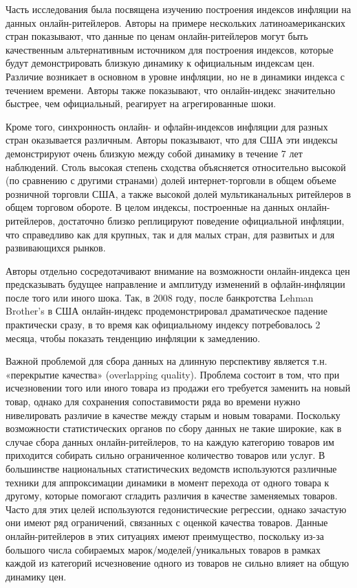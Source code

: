Часть исследования \cite{cavallo2016billion} была посвящена изучению построения индексов инфляции на данных онлайн-ритейлеров. Авторы на примере нескольких латиноамериканских стран показывают, что данные по ценам онлайн-ритейлеров могут быть качественным альтернативным источником для построения индексов, которые будут демонстрировать близкую динамику к официальным индексам цен. Различие возникает в основном в уровне инфляции, но не в динамики индекса с течением времени. Авторы также показывают, что онлайн-индекс значительно быстрее, чем официальный, реагирует на агрегированные шоки.

Кроме того, синхронность онлайн- и офлайн-индексов инфляции для разных стран оказывается различным. Авторы показывают, что для США эти индексы демонстрируют очень близкую между собой динамику в течение 7 лет наблюдений. Столь высокая степень сходства объясняется относительно высокой (по сравнению с другими странами) долей интернет-торговли в общем объеме розничной торговли США, а также высокой долей мультиканальных ритейлеров в общем торговом обороте. В целом индексы, построенные на данных онлайн-ритейлеров, достаточно близко реплицируют поведение официальной инфляции, что справедливо как для крупных, так и для малых стран, для развитых и для развивающихся рынков.

Авторы отдельно сосредотачивают внимание на возможности онлайн-индекса цен предсказывать будущее направление и амплитуду изменений в офлайн-инфляции после того или иного шока. Так, в 2008 году, после банкротства Lehman Brother’s в США онлайн-индекс продемонстрировал драматическое падение практически сразу, в то время как официальному индексу потребовалось 2 месяца, чтобы показать тенденцию инфляции к замедлению.

Важной проблемой для сбора данных на длинную перспективу является т.н. «перекрытие качества» (overlapping quality). Проблема состоит в том, что при исчезновении того или иного товара из продажи его требуется заменить на новый товар, однако для сохранения сопоставимости ряда во времени нужно нивелировать различие в качестве между старым и новым товарами. Поскольку возможности статистических органов по сбору данных не такие широкие, как в случае сбора данных онлайн-ритейлеров, то на каждую категорию товаров им приходится собирать сильно ограниченное количество товаров или услуг. В большинстве национальных статистических ведомств используются различные техники для аппроксимации динамики в момент перехода от одного товара к другому, которые помогают сгладить различия в качестве заменяемых товаров. Часто для этих целей используются гедонистические регрессии, однако зачастую они имеют ряд ограничений, связанных с оценкой качества товаров. Данные онлайн-ритейлеров в этих ситуациях имеют преимущество, поскольку из-за большого числа собираемых марок/моделей/уникальных товаров в рамках каждой из категорий исчезновение одного из товаров не сильно влияет на общую динамику цен. 


